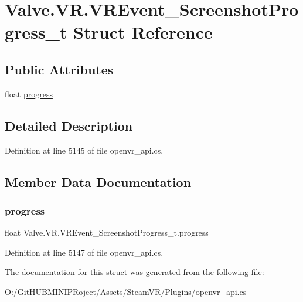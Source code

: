\hypertarget{struct_valve_1_1_v_r_1_1_v_r_event___screenshot_progress__t}{}\section{Valve.\+V\+R.\+V\+R\+Event\+\_\+\+Screenshot\+Progress\+\_\+t Struct Reference}
\label{struct_valve_1_1_v_r_1_1_v_r_event___screenshot_progress__t}
\subsection*{Public Attributes}
\begin{DoxyCompactItemize}
\item 
float \mbox{\hyperlink{struct_valve_1_1_v_r_1_1_v_r_event___screenshot_progress__t_a334ef159e534daa67837d21fc255b247}{progress}}
\end{DoxyCompactItemize}


\subsection{Detailed Description}


Definition at line 5145 of file openvr\+\_\+api.\+cs.



\subsection{Member Data Documentation}
\mbox{\label{struct_valve_1_1_v_r_1_1_v_r_event___screenshot_progress__t_a334ef159e534daa67837d21fc255b247}} 
\subsubsection{\texorpdfstring{progress}{progress}}
{\footnotesize\ttfamily float Valve.\+V\+R.\+V\+R\+Event\+\_\+\+Screenshot\+Progress\+\_\+t.\+progress}



Definition at line 5147 of file openvr\+\_\+api.\+cs.



The documentation for this struct was generated from the following file\+:\begin{DoxyCompactItemize}
\item 
O\+:/\+Git\+H\+U\+B\+M\+I\+N\+I\+P\+Roject/\+Assets/\+Steam\+V\+R/\+Plugins/\mbox{\hyperlink{openvr__api_8cs}{openvr\+\_\+api.\+cs}}\end{DoxyCompactItemize}
